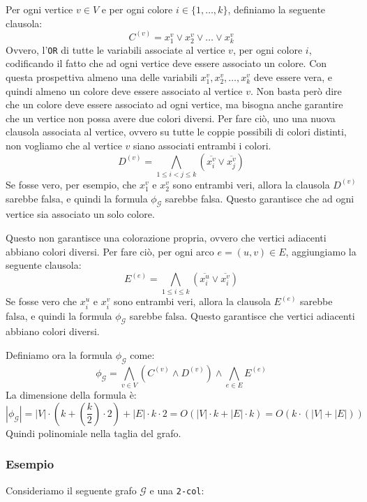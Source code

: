     Per ogni vertice $v \in V$ e per ogni colore $i \in \{1, \dots, k\}$, definiamo 
    la seguente clausola:
    \[
        C^{(v)} = x_1^v \lor x_2^v \lor \dots \lor x_k^v
    \]
    Ovvero, l'\texttt{OR} di tutte le variabili associate al vertice $v$, per ogni colore $i$,
    codificando il fatto che ad ogni vertice deve essere associato un colore. Con questa prospettiva
    almeno una delle variabili $x_1^v, x_2^v, \dots, x_k^v$ deve essere vera, e quindi almeno 
    un colore deve essere associato al vertice $v$.
    Non basta però dire che un colore deve essere associato ad ogni vertice, ma bisogna anche
    garantire che un vertice non possa avere due colori diversi. Per fare ciò, uno una nuova 
    clausola associata al vertice, ovvero su tutte le coppie possibili di colori 
    distinti, non vogliamo che al vertice $v$ siano associati entrambi i colori.
    \[
      D^{(v)} = \bigwedge_{1 \leq i < j \leq k} (\overline{x_i^v} \lor \overline{x_j^v})
    \]
    Se fosse vero, per esempio, che $x_1^v$ e $x_2^v$ sono entrambi veri, allora la clausola
    $D^{(v)}$ sarebbe falsa, e quindi la formula $\phi_\mathcal{G}$ sarebbe falsa. Questo
    garantisce che ad ogni vertice sia associato un solo colore.

    Questo non garantisce una colorazione propria, ovvero che vertici adiacenti abbiano colori
    diversi. Per fare ciò, per ogni arco $e = (u, v) \in E$, aggiungiamo la seguente clausola:
    \[
        E^{(e)} = \bigwedge_{1 \leq i \leq k} (\overline{x_i^u} \lor \overline{x_i^v})
    \]
    Se fosse vero che $x_i^u$ e $x_i^v$ sono entrambi veri, allora la clausola $E^{(e)}$ sarebbe
    falsa, e quindi la formula $\phi_\mathcal{G}$ sarebbe falsa. Questo garantisce che vertici
    adiacenti abbiano colori diversi.

    Definiamo ora la formula $\phi_\mathcal{G}$ come:
    \begin{equation}
        \label{eq:phi}
        \phi_\mathcal{G} = \bigwedge_{v \in V} \left(C^{(v)} \land D^{(v)}\right) \land \bigwedge_{e \in E} E^{(e)}
    \end{equation}
La dimensione della formula è:
\[
    |\phi_\mathcal{G}| = |V| \cdot \left(k + \left(\frac{k}{2}\right) \cdot 2 \right) 
    + |E| \cdot k \cdot 2 = O(|V| \cdot k + |E| \cdot k) = O( k \cdot (|V| + |E|) )
\]
Quindi polinomiale nella taglia del grafo.
\subsubsection{Esempio}
Consideriamo il seguente grafo $\mathcal{G}$ e una \texttt{2-col}:

